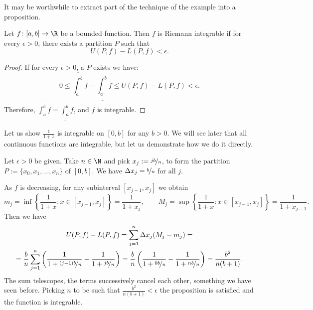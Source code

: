 \documentclass[12pt]{book}
\begin{document}
It may be worthwhile to extract part of the technique of the example into a
proposition.

\begin{prop}
Let $f \colon [a,b] \to \R$ be a bounded function.
Then $f$ is Riemann
integrable if for every $\epsilon > 0$, there exists a partition $P$ such that
\begin{equation*}
U(P,f) - L(P,f) < \epsilon .
\end{equation*}
\end{prop}

\begin{proof}
If for every $\epsilon > 0$, a $P$ exists we have:
\begin{equation*}
0 \leq
\overline{\int_a^b} f - 
\underline{\int_a^b} f
\leq
U(P,f) - L(P,f) < \epsilon .
\end{equation*}
Therefore, 
$\overline{\int_a^b} f = \underline{\int_a^b} f$, and $f$ is integrable.
\end{proof}

\begin{example}
Let us show $\frac{1}{1+x}$ is integrable on $[0,b]$ for any $b > 0$.
We will see later that all continuous functions are integrable, but let us
demonstrate how we do it directly.

Let $\epsilon > 0$ be given.
Take $n \in \N$ and
pick $x_j := \nicefrac{jb}{n}$, to form the 
partition $P := \{ x_0,x_1,\ldots,x_n \}$ of $[0,b]$.
We have $\Delta x_j = \nicefrac{b}{n}$ for all $j$.

As $f$ is decreasing, for any subinterval $[x_{j-1},x_j]$ we obtain
\begin{equation*}
m_j = \inf \left\{ \frac{1}{1+x} : x \in [x_{j-1},x_j] \right\} = \frac{1}{1+x_j} ,
\qquad
M_j = \sup \left\{ \frac{1}{1+x} : x \in [x_{j-1},x_j] \right\} =
\frac{1}{1+x_{j-1}} .
\end{equation*}
Then we have
\begin{multline*}
U(P,f)-L(P,f)
=
\sum_{j=1}^n
\Delta x_j
(M_j-m_j)
=
\\
=
\frac{b}{n}
\sum_{j=1}^n 
\left( \frac{1}{1+\nicefrac{(j-1)b}{n}} - \frac{1}{1+\nicefrac{jb}{n}} \right) 
=
\frac{b}{n}
\left( \frac{1}{1+\nicefrac{0b}{n}} - \frac{1}{1+\nicefrac{nb}{n}} \right) 
=
\frac{b^2}{n(b+1)} .
\end{multline*}
The sum telescopes, the terms successively cancel each other, something
we have seen before.
Picking $n$ to be such that
$\frac{b^2}{n(b+1)} < \epsilon$ the proposition is satisfied and the
function is integrable.
\end{example}
\end{document}
